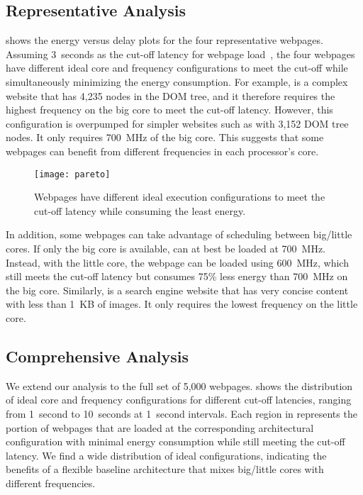 \subsection{Representative Analysis}
\label{sec:runtime:char:representative}

 shows the energy versus delay plots for the four representative webpages. Assuming 3~seconds as the cut-off latency for webpage load~\cite{ThreeSecond}, the four webpages have different ideal core and frequency configurations to meet the cut-off while simultaneously minimizing the energy consumption. For example,  is a complex website that has 4,235 nodes in the DOM tree, and it therefore requires the highest frequency on the big core to meet the cut-off latency. However, this configuration is overpumped for simpler websites such as  with 3,152 DOM tree nodes. It only requires 700~MHz of the big core. This suggests that some webpages can benefit from different frequencies in each processor's core.

\begin{figure}[p]
\centering
\texttt{[image: pareto]}
\caption{Webpages have different ideal execution configurations to meet the cut-off latency while consuming the least energy.}
\label{fig:pareto}
\end{figure}

In addition, some webpages can take advantage of scheduling between big/little cores. If only the big core is available,  can at best be loaded at 700~MHz. Instead, with the little core, the webpage can be loaded using 600~MHz, which still meets the cut-off latency but consumes 75\% less energy than 700~MHz on the big core. Similarly,  is a search engine website that has very concise content with less than 1~KB of images. It only requires the lowest frequency on the little core.

\subsection{Comprehensive Analysis}
\label{sec:runtime:char:comprehensive}

We extend our analysis to the full set of 5,000 webpages.  shows the distribution of ideal core and frequency configurations for different cut-off latencies, ranging from 1~second to 10~seconds at 1~second intervals. Each region in  represents the portion of webpages that are loaded at the corresponding architectural configuration with minimal energy consumption while still meeting the cut-off latency. We find a wide distribution of ideal configurations, indicating the benefits of a flexible baseline architecture that mixes big/little cores with different frequencies. 


